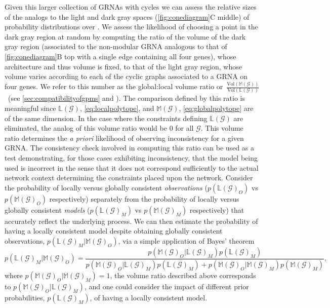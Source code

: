 Given this larger collection of GRNAs with cycles we can assess the relative sizes of the analogs to the light and dark gray spaces (\ref{fig:conediagram}C middle) of probability distributions over \gnpm{}. We assess the likelihood of choosing a point in the dark gray region at random by computing the ratio of the volume of the dark gray region (associated to the non-modular GRNA analogous to that of \ref{fig:conediagram}B top with a single edge containing all four genes), whose architecture and thus volume is fixed, to that of the light gray region, whose volume varies according to each of the cyclic graphs associated to a GRNA on four genes. We refer to this number as the global:local volume ratio or~$\frac{\text{Vol}(\mathbb{M}(\mathcal{G}))}{\text{Vol}(\mathbb{L}(\mathcal{G}))}$~(see \ref{sec:compatibilityofgpms} and ). The comparison defined by this ratio is meaningful since $\mathbb{L}(\mathcal{G})$, \ref{eq:localpolytope}, and $\mathbb{M}(\mathcal{G})$, \ref{eq:globalpolytope} are of the same dimension. In the case where the constraints defining $\mathbb{L}(\mathcal{G})$ are eliminated, the analog of this volume ratio would be $0$ for all $\mathcal{G}$. This volume ratio determines the \emph{a priori} likelihood of observing inconsistency for a given GRNA. The consistency check involved in computing this ratio can be used as a test demonstrating, for those cases exhibiting inconsistency, that the model being used is incorrect in the sense that it does not correspond sufficiently to the actual network context determining the constraints placed upon the network. Consider the probability of locally versus globally consistent \emph{observations} ($p(\mathbb{L}(\mathcal{G})_O)$  vs $p(\mathbb{M}(\mathcal{G})_O)$ respectively) separately from the probability of locally versus globally consistent \emph{models} ($p(\mathbb{L}(\mathcal{G})_M)$  vs $p(\mathbb{M}(\mathcal{G})_M)$ respectively) that accurately reflect the underlying process. We can then estimate the probability of having a locally consistent model despite obtaining globally consistent observations, $p(\mathbb{L}(\mathcal{G})_M | \mathbb{M}(\mathcal{G})_O)$, via a simple application of Bayes' theorem
$$
p(\mathbb{L}(\mathcal{G})_M | \mathbb{M}(\mathcal{G})_O) = \frac{p(\mathbb{M}(\mathcal{G})_O | \mathbb{L}(\mathcal{G})_M)p(\mathbb{L}(\mathcal{G})_M)}{p(\mathbb{M}(\mathcal{G})_O | \mathbb{L}(\mathcal{G})_M)p(\mathbb{L}(\mathcal{G})_M) + p(\mathbb{M}(\mathcal{G})_O | \mathbb{M}(\mathcal{G})_M)p(\mathbb{M}(\mathcal{G})_M)},
$$
where $p(\mathbb{M}(\mathcal{G})_O | \mathbb{M}(\mathcal{G})_M)=1$, the volume ratio described above corresponds to $p(\mathbb{M}(\mathcal{G})_O | \mathbb{L}(\mathcal{G})_M)$, and one could consider the impact of different prior probabilities, $p(\mathbb{L}(\mathcal{G})_M)$, of having a locally consistent model.

